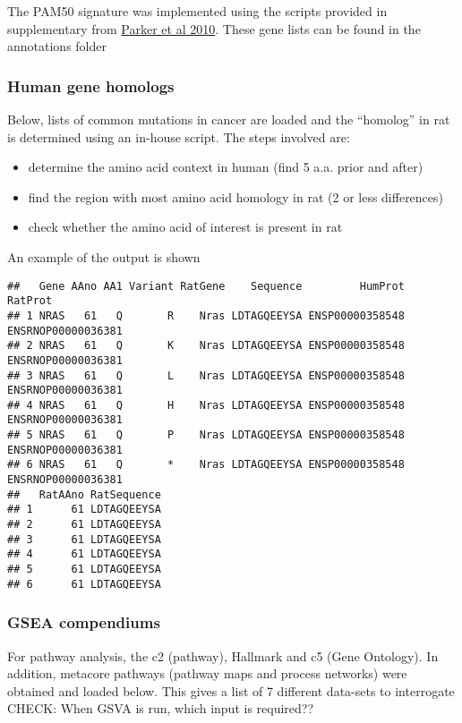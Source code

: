 \documentclass[
]{book}
\providecommand{\tightlist}{%
  \setlength{\itemsep}{0pt}\setlength{\parskip}{0pt}}
\begin{document}
The PAM50 signature was implemented using the scripts provided in supplementary from \href{https://genome.unc.edu/pubsup/breastGEO/PAM50.zip}{Parker et al 2010}. These gene lists can be found in the annotations folder

\hypertarget{human-gene-homologs}{%
\subsubsection{Human gene homologs}\label{human-gene-homologs}}

Below, lists of common mutations in cancer are loaded and the ``homolog'' in rat is determined using an in-house script. The steps involved are:

\begin{itemize}
\tightlist
\item
  determine the amino acid context in human (find 5 a.a. prior and after)
\item
  find the region with most amino acid homology in rat (2 or less differences)
\item
  check whether the amino acid of interest is present in rat
\end{itemize}

An example of the output is shown

\begin{verbatim}
##   Gene AAno AA1 Variant RatGene    Sequence         HumProt            RatProt
## 1 NRAS   61   Q       R    Nras LDTAGQEEYSA ENSP00000358548 ENSRNOP00000036381
## 2 NRAS   61   Q       K    Nras LDTAGQEEYSA ENSP00000358548 ENSRNOP00000036381
## 3 NRAS   61   Q       L    Nras LDTAGQEEYSA ENSP00000358548 ENSRNOP00000036381
## 4 NRAS   61   Q       H    Nras LDTAGQEEYSA ENSP00000358548 ENSRNOP00000036381
## 5 NRAS   61   Q       P    Nras LDTAGQEEYSA ENSP00000358548 ENSRNOP00000036381
## 6 NRAS   61   Q       *    Nras LDTAGQEEYSA ENSP00000358548 ENSRNOP00000036381
##   RatAAno RatSequence
## 1      61 LDTAGQEEYSA
## 2      61 LDTAGQEEYSA
## 3      61 LDTAGQEEYSA
## 4      61 LDTAGQEEYSA
## 5      61 LDTAGQEEYSA
## 6      61 LDTAGQEEYSA
\end{verbatim}

\hypertarget{gsea-compendiums}{%
\subsubsection{GSEA compendiums}\label{gsea-compendiums}}

For pathway analysis, the c2 (pathway), Hallmark and c5 (Gene Ontology). In addition, metacore pathways (pathway maps and process networks) were obtained and loaded below. This gives a list of 7 different data-sets to interrogate
{
CHECK: When GSVA is run, which input is required??
}
\end{document}
